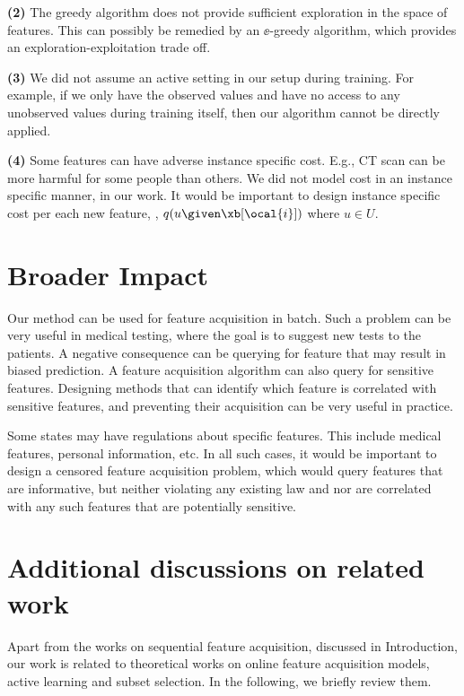 \documentclass[letterpaper]{article}
\begin{document}
\textbf{(2)} The greedy algorithm does not provide sufficient exploration in the space of features. This can possibly be remedied by an $\ee$-greedy algorithm, which provides an exploration-exploitation trade off.

\textbf{(3)} We did not assume an active setting in our setup during training. For example, if we only have the observed values and have no access to any unobserved values during training itself, then our algorithm cannot be directly applied. 

\textbf{(4)} Some features can have adverse instance specific cost. E.g., CT scan can be more harmful for some people than others. We did not model cost in an instance specific manner, in our work. It would be important to design instance specific cost per each new feature, \ie, $q(u \given \xb[\ocal{i}])$ where $u\in U$.

\section{Broader Impact}
\label{app:broader}
Our method can be used for feature acquisition in batch. Such a problem can be very useful in medical testing, where the goal is to suggest new tests to the patients.
A negative consequence can be querying for feature that may result in biased prediction. A feature acquisition algorithm can also query for sensitive features. Designing methods that can identify which feature is correlated with sensitive features, and preventing their acquisition can be very useful in practice.

Some states may have regulations about specific features. This include medical features, personal information, etc. In all such cases, it would be important to design a censored feature acquisition problem, which would query features that are informative, but neither violating any existing law and nor are correlated with any such features that are potentially sensitive.

\newpage
\section{Additional discussions on related work}
\label{app:related}

Apart from the works on sequential feature acquisition, discussed in Introduction, our work is related to theoretical works on online feature acquisition models, active learning and subset selection. In the following, we briefly review them.
\end{document}
